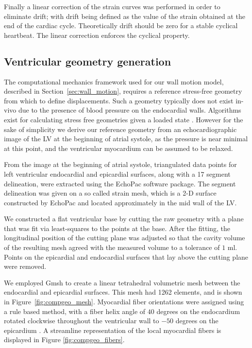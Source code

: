 Finally a linear correction of the strain curves was performed in order to 
eliminate drift; with drift being defined as the value of the strain obtained at
the end of the cardiac cycle. Theoretically drift should be zero for a stable cyclical heartbeat.
The linear correction enforces the cyclical property.

\subsection{Ventricular geometry generation}
\label{sec:compgeo}
The computational mechanics framework used for our wall motion model,
described in Section~\ref{sec:wall_motion}, requires a reference stress-free geometry from
which to define displacements. Such a geometry typically does not exist in-vivo due to the 
presence of blood pressure on the endocardial walls. Algorithms exist for calculating
stress free geometries given a loaded state \cite{bols2013computational, gee2010computational}.
However for the sake of simplicity we derive our reference geometry from an echocardiographic
image of the LV at the beginning of atrial systole,
as the pressure is near minimal at this point, and the ventricular myocardium
can be assumed to be relaxed.

From the image at the beginning of atrial systole, triangulated data points
for left ventricular endocardial and epicardial surfaces, along with a 17 segment delineation,
were extracted using the EchoPac software package.
The segment delineation was given on a so called strain mesh, which is a 2-D surface constructed by
EchoPac and located approximately in the mid wall of the LV.


We constructed a flat ventricular base by cutting the raw geometry
with a plane that was fit via least-squares to the points at the base.
After the fitting, the longitudinal position of the cutting plane was
adjusted so that the cavity volume of the resulting mesh agreed with
the measured volume to a tolerance of $1$ ml. Points on the epicardial
and endocardial surfaces that lay above the cutting plane were removed. 

We employed Gmsh \cite{geuzaine2009gmsh} to create a 
linear tetrahedral volumetric mesh between the endocardial and epicardial surfaces. 
This mesh had 1262 elements, and is shown in Figure~\ref{fig:compgeo_mesh}.
Myocardial fiber orientations were assigned using a rule based method,
with a fiber helix angle of $40$ degrees on the 
endocardium rotated clockwise throughout the ventricular wall 
to $-50$ degrees on the epicardium \cite{bayer2012novel}. 
A streamline representation of the local myocardial fibers is displayed
in Figure \ref{fig:compgeo_fibers}.

